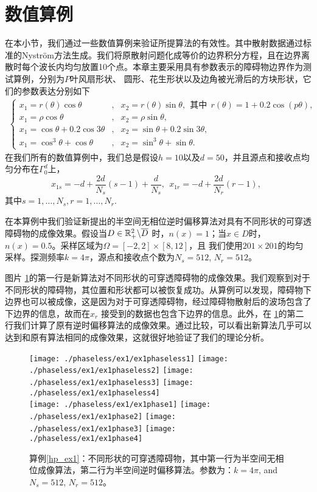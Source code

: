 \section{数值算例}
在本小节，我们通过一些数值算例来验证所提算法的有效性。其中散射数据通过标准的Nystr\"om方法生成。我们将原散射问题化成等价的边界积分方程，且在边界离散时每个波长内均匀放置10个点。本章主要采用具有参数表示的障碍物边界作为测试算例，分别为$P$叶风扇形状、 圆形、花生形状以及边角被光滑后的方块形状，它们的参数表达分别如下
\begin{eqnarray}\label{obstacle_example}
\left\{
\begin{array}{lll}
x_1=r(\theta)\cos\theta&,& x_2=r(\theta)\sin\theta,\ \ \mbox{其中}\ \ r(\theta)=1+0.2\cos(p\theta),\\
x_1=\rho\cos{\theta}&,& x_2=\rho\sin{\theta},\\
x_1=\cos{\theta}+0.2\cos{3\theta}&,& x_2=\sin{\theta}+0.2\sin{3\theta},\\
x_1=\cos^3\theta+\cos{\theta}&,& x_2=\sin^3\theta+\sin{\theta}.
\end{array}
\right.
\end{eqnarray}
在我们所有的数值算例中，我们总是假设$h=10$以及$d=50$，并且源点和接收点均匀分布在$\Gamma_0^d$上，
$$
 x_{1s}=-d+\frac{2d}{N_s}(s-1)+\frac{d}{N_s},\  \ x_{1r}=-d+\frac{2d}{N_r}(r-1),\ \
$$
其中$s=1,\ldots,N_s, r=1,\ldots,N_r.$
\begin{example}\label{hp_ex1}
在本算例中我们验证新提出的半空间无相位逆时偏移算法对具有不同形状的可穿透障碍物的成像效果。假设当$D\in\mathbb{R}^2_+\backslash\overline D$ 时，$n(x)=1$；当$x\in D$时， $n(x)=0.5$。采样区域为$\Omega=[-2,2]\times[8,12]$，且
我们使用$201\times201$的均匀采样。探测频率$k=4\pi$，源点和接收点个数为$N_s=512$, $N_r=512$。

图片 \ref{fig1}的第一行是新算法对不同形状的可穿透障碍物的成像效果。我们观察到对于不同形状的障碍物，其位置和形状都可以被恢复成功。从算例可以发现，障碍物下边界也可以被成像，这是因为对于可穿透障碍物，经过障碍物散射后的波场包含了下边界的信息，故而在$x_r$ 接受到的数据也包含下边界的信息。此外，在 \ref{fig1}的第二行我们计算了原有逆时偏移算法的成像效果。通过比较，可以看出新算法几乎可以达到和原有算法相同的成像效果，这就很好地验证了我们的理论分析。
\end{example}
\begin{figure}[h]
  \centering
  \texttt{[image: ./phaseless/ex1/ex1phaseless1]}
  \texttt{[image: ./phaseless/ex1/ex1phaseless2]}
  \texttt{[image: ./phaseless/ex1/ex1phaseless3]}
  \texttt{[image: ./phaseless/ex1/ex1phaseless4]}\\
  \texttt{[image: ./phaseless/ex1/ex1phase1]}
  \texttt{[image: ./phaseless/ex1/ex1phase2]}
  \texttt{[image: ./phaseless/ex1/ex1phase3]}
  \texttt{[image: ./phaseless/ex1/ex1phase4]}
  \caption{算例\ref{hp_ex1}：不同形状的可穿透障碍物，其中第一行为半空间无相位成像算法，第二行为半空间逆时偏移算法。参数为：$k=4\pi$, and $N_s=512$, $N_r=512$。} \label{fig1}
\end{figure}

